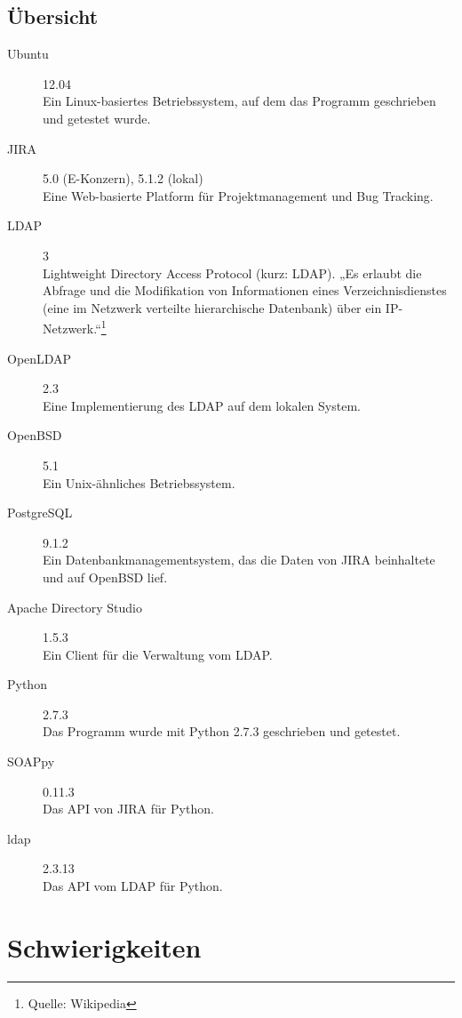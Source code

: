 \documentclass[a4paper,12pt]{report}
\begin{document}
	\section{Übersicht}
	\begin{description}
	\item[Ubuntu] 12.04 \hfill \\
	Ein Linux-basiertes Betriebssystem, auf dem das Programm geschrieben und getestet wurde.
	\item[JIRA] 5.0 (E-Konzern), 5.1.2 (lokal) \hfill \\
	Eine Web-basierte Platform für Projektmanagement und Bug Tracking.
	\item[LDAP] 3 \hfill \\
	Lightweight Directory Access Protocol (kurz: LDAP). „Es erlaubt die Abfrage und die Modifikation von Informationen eines Verzeichnisdienstes (eine im Netzwerk verteilte hierarchische Datenbank) über ein IP-Netzwerk.“\footnote{Quelle: Wikipedia}
	\item[OpenLDAP] 2.3 \hfill \\
	Eine Implementierung des LDAP auf dem lokalen System.
	\item[OpenBSD] 5.1 \hfill \\
	Ein Unix-ähnliches Betriebssystem.
	\item[PostgreSQL] 9.1.2 \hfill \\
	Ein Datenbankmanagementsystem, das die Daten von JIRA beinhaltete und auf OpenBSD lief.
	\item[Apache Directory Studio] 1.5.3  \hfill \\
	Ein Client für die Verwaltung vom LDAP.
	\item[Python] 2.7.3 \hfill \\
	Das Programm wurde mit Python 2.7.3 geschrieben und getestet.
	\item[SOAPpy] 0.11.3 \hfill \\
	Das API von JIRA für Python.
	\item[ldap] 2.3.13 \hfill \\
	Das API vom LDAP für Python.
	\end{description}
	                                                                                                                                                                                                                                                                                                                                                                     
	
\chapter{Schwierigkeiten}	
\end{document}
